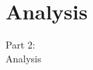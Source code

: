 \section{Analysis}
\begin{frame}[fragile]
  \vspace{25mm}
  \begin{center}
    \Huge{Part 2:\\Analysis}
  \end{center}
\end{frame}
